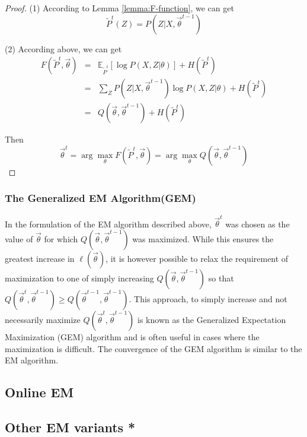 \begin{proof}
(1) According to Lemma \ref{lemma:F-function}, we can get
\begin{equation}
\tilde{P}^t(Z)=P(Z|X, \vec{\theta}^{t-1}) \nonumber
\end{equation}

(2) According above, we can get
\begin{eqnarray}
F(\tilde{P}^t,\vec{\theta}) &=& \mathbb{E}_{\tilde{P}^t}\left[\log{P(X,Z|\theta)}\right]+H(\tilde{P}^t) \nonumber \\
    &=& \sum\limits_Z{P(Z|X,\vec{\theta}^{t-1})\log{P(X,Z|\theta)}}+H(\tilde{P}^t) \nonumber \\
	&=& Q(\vec{\theta}, \vec{\theta}^{t-1})+H(\tilde{P}^t)\nonumber
\end{eqnarray}

Then
\begin{equation}
\vec{\theta}^t=\arg\max\limits_{\theta}F(\tilde{P}^t,\vec{\theta})=\arg\max\limits_{\theta}Q(\vec{\theta}, \vec{\theta}^{t-1}) \nonumber
\end{equation}
\end{proof}


\subsubsection{The Generalized EM Algorithm(GEM)}
In the formulation of the EM algorithm described above, $\vec{\theta}^t$ was chosen as the value of $\vec{\theta}$ for which $Q(\vec{\theta}, \vec{\theta}^{t-1})$ was maximized. While this ensures the greatest increase in $\ell(\vec{\theta})$, it is however possible to relax the requirement of maximization to one of simply increasing $Q(\vec{\theta}, \vec{\theta}^{t-1})$ so that $Q(\vec{\theta}^t, \vec{\theta}^{t-1}) \geq Q(\vec{\theta}^{t-1}, \vec{\theta}^{t-1})$. This approach, to simply increase and not necessarily maximize $Q(\vec{\theta}^t, \vec{\theta}^{t-1})$ is known as the Generalized Expectation Maximization (GEM) algorithm and is often useful in cases where the maximization is difficult. The convergence of the GEM algorithm is similar to the EM algorithm.


\subsection{Online EM}


\subsection{Other EM variants *}


